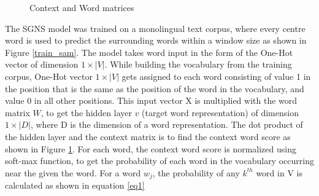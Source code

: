 \documentclass[12pt]{report} %
\begin{document}

\begin{figure}[h]
	\centering
	\caption{Context and Word matrices \citep{jurafsky2014speech}}
	\label{C_W_matrics}	
\end{figure}


The SGNS model was trained on a monolingual text corpus, where every centre word is used to predict the surrounding words within a window size as shown in Figure \ref{train_sam}.
The model takes word input in the form of the One-Hot vector of dimension $1\times|V|$. While building the vocabulary from the training corpus, One-Hot vector $1\times|V|$ gets assigned to each word consisting of value 1 in the position that is the same as the position of the word in the vocabulary, and value 0 in all other positions. This input vector X is multiplied with the word matrix $W$, to get the hidden layer $v$ (target word representation) of dimension $1\times|D|$, where D is the dimension of a word representation. The dot product of the hidden layer and the context matrix is to find the context word score as shown in Figure \ref{C_W_matrics}. For each word, the context word score is normalized using soft-max function, to get the probability of each word in the vocabulary occurring near the given the word. For a word $w_{j}$, the probability of any $k^{th}$ word in V is calculated as shown in equation \ref{eq1}
\end{document}
